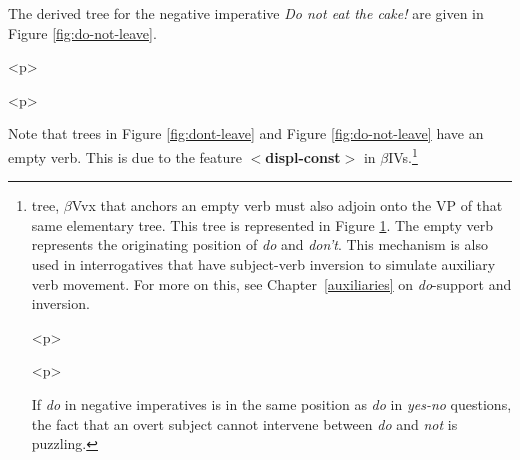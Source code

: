 {The  derived tree for the negative imperative {\it Do not eat the cake!} are 
given in Figure \ref{fig:do-not-leave}. 
 
\begin{rawhtml} <p> \end{rawhtml}
\begin{center} \leavevmode 
{} 
\end{center} 
\begin{rawhtml} <dl> <dt>{Derived trees for  Do not eat the cake! <p> </dl> \end{rawhtml}
\label{fig:do-not-leave} 
\begin{rawhtml} <p> \end{rawhtml}
 
Note that trees in Figure \ref{fig:dont-leave} and Figure 
\ref{fig:do-not-leave} have an empty verb.  This is due to the feature {\bf $<$displ-const$>$} in $\beta$IVs.\footnote{%
tree, $\beta$Vvx that anchors an empty verb must also adjoin onto the VP of 
that same elementary tree.  This tree is represented in Figure 
\ref{fig:epsilon}.  The empty verb represents the originating position of 
{\it do} and {\it don't}.  This mechanism is also used in interrogatives 
that have subject-verb inversion to simulate auxiliary verb movement.  For 
more on this, see Chapter~\ref{auxiliaries} on {\it do}-support and 
inversion. 
 
\begin{rawhtml} <p> \end{rawhtml}
  \begin{center} \leavevmode {} 
  \end{center} 
  \begin{rawhtml} <dl> <dt>{$\beta$Vvx[$\epsilon$] <p> </dl> \end{rawhtml}
\label{fig:epsilon} 
\begin{rawhtml} <p> \end{rawhtml}
 
 
If {\it do} in negative imperatives is in the same position as {\it do} in 
{\it yes-no} questions, the fact that an overt subject cannot intervene 
between {\it do} and {\it not} is puzzling. 
 
}}
